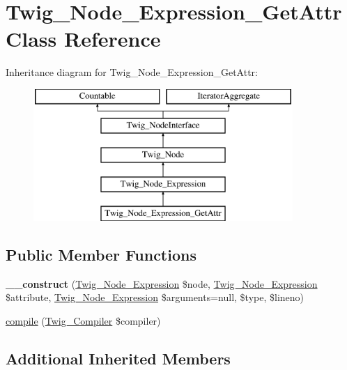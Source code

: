 \hypertarget{class_twig___node___expression___get_attr}{}\section{Twig\+\_\+\+Node\+\_\+\+Expression\+\_\+\+Get\+Attr Class Reference}
\label{class_twig___node___expression___get_attr}
Inheritance diagram for Twig\+\_\+\+Node\+\_\+\+Expression\+\_\+\+Get\+Attr\+:\begin{figure}[H]
\begin{center}
\leavevmode
\includegraphics[height=5.000000cm]{class_twig___node___expression___get_attr}
\end{center}
\end{figure}
\subsection*{Public Member Functions}
\begin{DoxyCompactItemize}
\item 
\hypertarget{class_twig___node___expression___get_attr_a975af51d3875be6433e04f3c37684e4b}{}{\bfseries \+\_\+\+\_\+construct} (\hyperlink{class_twig___node___expression}{Twig\+\_\+\+Node\+\_\+\+Expression} \$node, \hyperlink{class_twig___node___expression}{Twig\+\_\+\+Node\+\_\+\+Expression} \$attribute, \hyperlink{class_twig___node___expression}{Twig\+\_\+\+Node\+\_\+\+Expression} \$arguments=null, \$type, \$lineno)\label{class_twig___node___expression___get_attr_a975af51d3875be6433e04f3c37684e4b}

\item 
\hyperlink{class_twig___node___expression___get_attr_a4e0faa87c3fae583620b84d3607085da}{compile} (\hyperlink{class_twig___compiler}{Twig\+\_\+\+Compiler} \$compiler)
\end{DoxyCompactItemize}
\subsection*{Additional Inherited Members}


